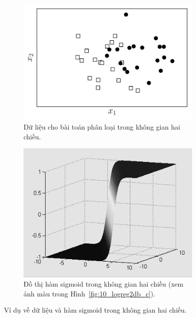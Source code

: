 \begin{figure}[t]
\begin{subfigure}{0.49\textwidth}
\includegraphics[width=0.99\linewidth]{ebookML_src/src/logistic_regression/logistic_2d.pdf}
\caption{Dữ liệu cho bài toán phân loại trong không gian hai chiều.}
\label{fig:10_logreg2da}
\end{subfigure}
\begin{subfigure}{0.45\textwidth}
\includegraphics[width=0.99\linewidth]{Chapters/05_NeuralNetworks/10_logisticregression/plaszczyzna_gray.png}
\caption{Đồ thị hàm sigmoid trong không gian hai chiều (xem ảnh màu trong Hình~\ref{fig:10_logreg2db_c}).}
\label{fig:10_logreg2db}
\end{subfigure}
\caption{
Ví dụ về dữ liệu và hàm sigmoid trong không gian hai chiều.
}
\label{fig:10_logreg2d}
\end{figure}



